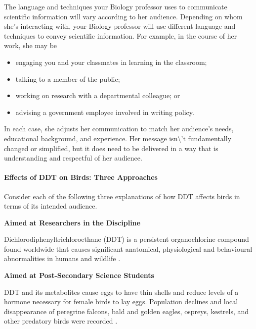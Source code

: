 \documentclass[
]{book}
\providecommand{\tightlist}{%
  \setlength{\itemsep}{0pt}\setlength{\parskip}{0pt}}
\begin{document}
The language and techniques your Biology professor uses to communicate scientific information will vary according to her audience. Depending on whom she's interacting with, your Biology professor will use different language and techniques to convey scientific information. For example, in the course of her work, she may be

\begin{itemize}
\tightlist
\item
  engaging you and your classmates in learning in the classroom;
\item
  talking to a member of the public;
\item
  working on research with a departmental colleague; or
\item
  advising a government employee involved in writing policy.
\end{itemize}

In each case, she adjusts her communication to match her audience's needs, educational background, and experience. Her message isn\textbackslash't fundamentally changed or simplified, but it does need to be delivered in a way that is understanding and respectful of her audience.

\hypertarget{effects-of-ddt-on-birds-three-approaches}{%
\paragraph*{Effects of DDT on Birds: Three Approaches}\label{effects-of-ddt-on-birds-three-approaches}}

Consider each of the following three explanations of how DDT affects birds in terms of its intended audience.

\textbf{Aimed at Researchers in the Discipline}

Dichlorodiphenyltrichloroethane (DDT) is a persistent organochlorine compound found worldwide that causes significant anatomical, physiological and behavioural abnormalities in humans and wildlife \citep{iwaniuk_effects_2006}.

\textbf{Aimed at Post-Secondary Science Students}

DDT and its metabolites cause eggs to have thin shells and reduce levels of a hormone necessary for female birds to lay eggs. Population declines and local disappearance of peregrine falcons, bald and golden eagles, ospreys, kestrels, and other predatory birds were recorded \citep{cox_pesticides_1991}.
\end{document}
